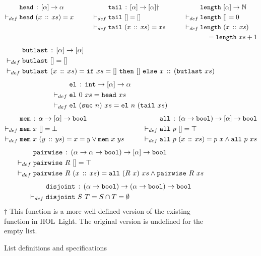 \begin{figure}
\begin{alignat*}{3}
  & \texttt{head}\,:\,[\alpha] \rightarrow \alpha &\qquad
  & \texttt{tail}\,:\,[\alpha] \rightarrow [\alpha]\dag &\qquad
  & \texttt{length}\ [\alpha]\rightarrow \mathbb{N}\\
  \vdash_{def}\;& \texttt{head}\ (x\,::\,xs) = x &\qquad
  \vdash_{def}\;& \texttt{tail}\ [] = [] &\qquad
  \vdash_{def}\;& \texttt{length}\ [] = 0\\
  & &\qquad
  \vdash_{def}\;&\texttt{tail}\ (x\,::\,xs) = xs &\qquad
  \vdash_{def}\;& \texttt{length}\ (x\,::\,xs)\\
  & & & & &\quad = \texttt{length}\ xs + 1
\end{alignat*}
\begin{align*}
  &\code{butlast}\,:\,[\alpha] \rightarrow [\alpha]\\
  \vdash_{def}\;&\code{butlast}\ [] = []\\
  \vdash_{def}\;&\code{butlast}\ (\cons{x}{xs}) = \code{if}\ xs=[]\ \code{then}\ []\ \code{else}\ \cons{x}{(\code{butlast}\ xs)}
\end{align*}
\begin{align*}
  &\code{el}\,:\,\code{int} \rightarrow [\alpha] \rightarrow \alpha\\
  \vdash_{def}\;&\code{el}\ 0\ xs = \code{head}\ xs\\
  \vdash_{def}\;&\code{el}\ (\code{suc}\ n)\ xs = \code{el}\ n\ (\code{tail}\ xs)
\end{align*}
\begin{align*}
  & \texttt{mem}\,:\,\alpha \rightarrow [\alpha] \rightarrow \texttt{bool} &\qquad
  & \texttt{all}\,:\,(\alpha\rightarrow\texttt{bool}) \rightarrow [\alpha] \rightarrow \texttt{bool}\\
  \vdash_{def}\;& \texttt{mem}\ x\ [] = \bot &\qquad
  \vdash_{def}\;& \texttt{all}\ p\ [] = \top\\
  \vdash_{def}\;& \texttt{mem}\ x\ (y\,::\,ys) = x = y \vee \texttt{mem}\ x\ ys &\qquad
  \vdash_{def}\;& \texttt{all}\ p\ (x\,::\,xs) = p\ x \wedge \texttt{all}\ p\ xs   
\end{align*}
\begin{align*}
  & \code{pairwise}\,:\,(\alpha \rightarrow \alpha \rightarrow \code{bool}) \rightarrow [\alpha] \rightarrow \code{bool}\\
  \vdash_{def}\;& \code{pairwise}\ R\ [] = \top\\
  \vdash_{def}\;& \code{pairwise}\ R\ (\cons{x}{xs}) = \code{all}\ (R\ x)\ xs \wedge \code{pairwise}\ R\ xs
\end{align*}
\begin{align*}
  & \texttt{disjoint}\,:\,(\alpha\rightarrow\texttt{bool})\rightarrow(\alpha\rightarrow\texttt{bool})\rightarrow\texttt{bool}\\
  \vdash_{def}\;& \texttt{disjoint}\ S\ T = S \cap T = \emptyset
\end{align*}
$\dag$ This function is a more well-defined version of the existing function in HOL~Light. The original version is undefined for the empty list.
\caption{List definitions and specifications}
\label{fig:ListDefinitions}
\end{figure}

